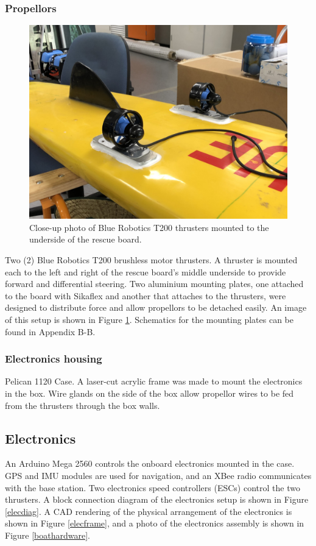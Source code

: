 \documentclass[a4paper]{IEEEtran}
\begin{document}
\subsubsection{Propellors}
\begin{figure}[h!]
\includegraphics[width=\columnwidth]{motors-mounted.jpg}
\caption{Close-up photo of Blue Robotics T200 thrusters mounted to the underside of the rescue board.}
\label{propmount}
\end{figure}
Two (2) Blue Robotics T200 brushless motor thrusters. A thruster is mounted each to the left and right of the rescue board's middle underside to provide forward and differential steering. Two aluminium mounting plates, one attached to the board with Sikaflex and another that attaches to the thrusters, were designed to distribute force and allow propellors to be detached easily. An image of this setup is shown in Figure \ref{propmount}. Schematics for the mounting plates can be found in Appendix B-B.

\subsubsection{Electronics housing}
Pelican 1120 Case. A laser-cut acrylic frame was made to mount the electronics in the box. Wire glands on the side of the box allow propellor wires to be fed from the thrusters through the box walls.

\subsection{Electronics}
An Arduino Mega 2560 controls the onboard electronics mounted in the case. GPS and IMU modules are used for navigation, and an XBee radio communicates with the base station. Two electronics speed controllers (ESCs) control the two thrusters. A block connection diagram of the electronics setup is shown in Figure \ref{elecdiag}. A CAD rendering of the physical arrangement of the electronics is shown in Figure \ref{elecframe}, and a photo of the electronics assembly is shown in Figure \ref{boathardware}.
\end{document}
